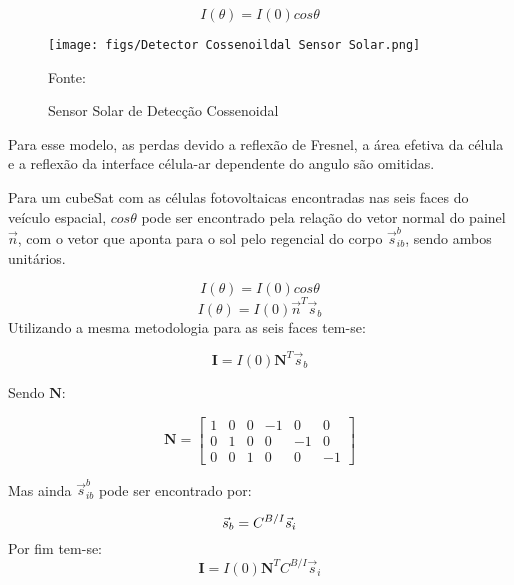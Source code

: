 \begin{equation}
I\left (  \theta \right ) = I\left ( 0 \right )cos\theta
\end{equation}

\begin{figure}[htpb]
\centering
\texttt{[image: figs/Detector Cossenoildal Sensor Solar.png]}
\caption{Sensor Solar de Detecção Cossenoidal}
{Fonte: \cite[p.~156]{wertz2012spacecraft}}
\label{fig:4}
\end{figure}

Para esse modelo, as perdas devido a reflexão de Fresnel, a área efetiva da célula e a reflexão da interface célula-ar dependente do angulo são omitidas.

Para um cubeSat com as células fotovoltaicas encontradas nas seis faces do veículo espacial,  $cos\theta$ pode ser encontrado pela relação do vetor normal do painel $\vec{n}$, com o vetor que aponta para o sol pelo regencial do corpo $\vec{s}^b_{ib}$, sendo ambos unitários.

\begin{equation}
I(\theta)=I(0)cos\theta
\end{equation}
\begin{equation}
I(\theta)=I(0)\vec{n}^T \vec{s}_b
\end{equation}
Utilizando a mesma metodologia para as seis faces tem-se:

\begin{equation}
\mathbf{I}=I(0)\mathbf{N}^T\vec{s}_b
\end{equation}

Sendo $\mathbf{N}$:

\begin{equation}
\mathbf{N}=\begin{bmatrix}
1 & 0 & 0 & -1 & 0 & 0\\ 
0 & 1 & 0 & 0 & -1 & 0\\ 
0 & 0 & 1 & 0 & 0 & -1
\end{bmatrix}\end{equation}

Mas ainda $\vec{s}^b_{ib}$ pode ser encontrado por:

\begin{equation}
\vec{s}_b=C^{B/I}\vec{s}_i\\
\end{equation}
Por fim tem-se:
\begin{equation}
\mathbf{I}=I(0)\mathbf{N}^T C^{B/I}\vec{s}_i
\end{equation}

